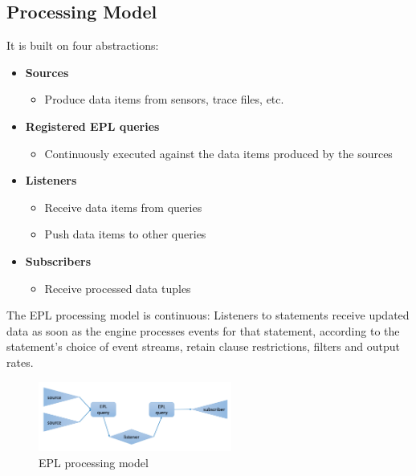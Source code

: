 \documentclass[10pt,a4paper]{article}
\begin{document}
\subsection{Processing Model}
It is built on four abstractions:
\begin{itemize}
	\item \textbf{Sources}
	\begin{itemize}
		\item Produce data items from sensors, trace files, etc.
	\end{itemize}
	\item \textbf{Registered EPL queries}
	\begin{itemize}
		\item Continuously executed against the data items produced by the sources
	\end{itemize}
	\item \textbf{Listeners}
	\begin{itemize}
		\item Receive data items from queries
		\item Push data items to other queries
	\end{itemize}
	\item \textbf{Subscribers}
	\begin{itemize}
		\item Receive processed data tuples
	\end{itemize}
\end{itemize}
The EPL processing model is continuous: Listeners to statements receive updated data as soon as the engine processes events for that statement, according to the statement's choice of event streams, retain clause restrictions, filters and output rates.
\begin{figure}[ht!]
 \hfill \includegraphics[width=180pt]{images/epl-processing-model.png}\hspace*{\fill}
 \caption{EPL processing model}
\end{figure} 
\end{document}

